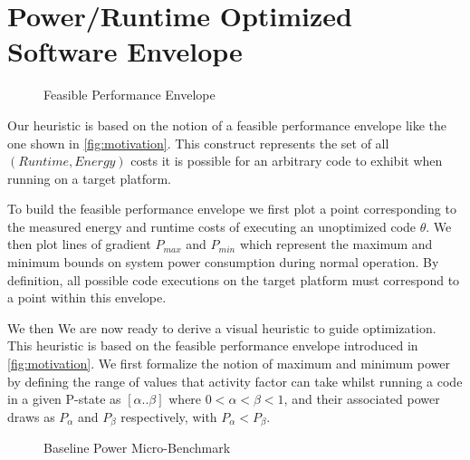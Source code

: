 \section{Power/Runtime Optimized Software Envelope}

\begin{figure}
\centering

\caption{Feasible Performance Envelope}
\label{fig:motivation}
\end{figure}

Our heuristic is based on the notion of a feasible performance envelope like the one shown in \autoref{fig:motivation}.
This construct represents the set of all $(Runtime, Energy)$ costs it is possible for an arbitrary code to exhibit when running on a target platform. 

To build the feasible performance envelope we first plot a point corresponding to the measured energy and runtime costs of executing an unoptimized code $\theta$. 
We then plot lines of gradient $P_{max}$ and $P_{min}$ which represent the maximum and minimum bounds on system power consumption during normal operation.
By definition, all possible code executions on the target platform must correspond to a point within this envelope.




We then
We are now ready to derive a visual heuristic to guide optimization. This heuristic is based on the feasible performance envelope introduced in \autoref{fig:motivation}. We first formalize the notion of maximum and minimum power by defining the range of values that activity factor can take whilst running a code in a given P-state as $[\alpha  .. \beta]$ where $0 < \alpha < \beta < 1$, and their associated power draws as $P_{\alpha}$ and $P_{\beta}$ respectively, with $P_{\alpha} < P_{\beta}$. 

\begin{figure}[ht]                                                               
\centering                                                                      
\lstset{basicstyle=\ttfamily\footnotesize\bfseries, frame=tb} %
              
\caption{Baseline Power Micro-Benchmark}                            
\label{fig:microbench}                                                           
\end{figure}  

